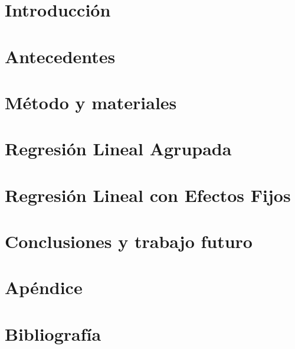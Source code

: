 \documentclass[11pt,a4paper,twoside]{tesis}
\begin{document}
\def\titulo{Licenciado }

\def\autor{Juan Manuel Pérez}
\def\tituloTesis{Mimetización entre interlocutores}
\def\runtitulo{Medición de la mimetización entre interlocutores utilizando series de tiempo}
\def\runtitle{Measuring entrainment between speakers using time series}
\def\director{Agustín Gravano}
\def\codirector{Ramiro Gálvez}
\def\lugar{Buenos Aires, 2015}


\frontmatter
\pagestyle{empty}




\listoftodos

\tableofcontents

\mainmatter
\pagestyle{headings}



\chapter{Introducción}



\chapter{Antecedentes}


\chapter{Método y materiales}


\chapter{Regresión Lineal Agrupada}


\chapter{Regresión Lineal con Efectos Fijos}


\chapter{Conclusiones y trabajo futuro}


\chapter{Apéndice}



\chapter{Bibliografía}
\backmatter



\end{document}
